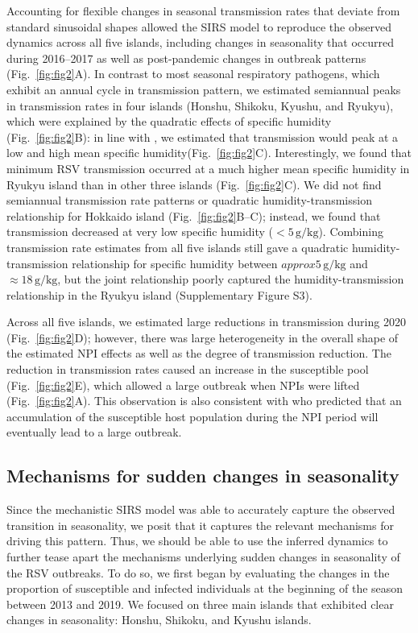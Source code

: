 \documentclass[12pt]{article}
\newcommand{\fref}[1]{Fig.~\ref{fig:#1}}
\begin{document}
Accounting for flexible changes in seasonal transmission rates that deviate from standard sinusoidal shapes allowed the SIRS model to reproduce the observed dynamics across all five islands, including changes in seasonality that occurred during 2016--2017 as well as post-pandemic changes in outbreak patterns (\fref{fig2}A).
In contrast to most seasonal respiratory pathogens, which exhibit an annual cycle in transmission pattern, we estimated semiannual peaks in transmission rates in four islands (Honshu, Shikoku, Kyushu, and Ryukyu), which were explained by the quadratic effects of specific humidity (\fref{fig2}B):
in line with \cite{baker2019epidemic}, we estimated that transmission would peak at a low and high mean specific humidity(\fref{fig2}C).
Interestingly, we found that minimum RSV transmission occurred at a much higher mean specific humidity in Ryukyu island than in other three islands (\fref{fig2}C).
We did not find semiannual transmission rate patterns or quadratic humidity-transmission relationship for Hokkaido island (\fref{fig2}B--C);
instead, we found that transmission decreased at very low specific humidity ($<5\,\mathrm{g/kg}$).
Combining transmission rate estimates from all five islands still gave a quadratic humidity-transmission relationship for specific humidity between $approx5\,\mathrm{g/kg}$ and $\approx18\,\mathrm{g/kg}$, but the joint relationship poorly captured the humidity-transmission relationship in the Ryukyu island (Supplementary Figure S3).

Across all five islands, we estimated large reductions in transmission during 2020  (\fref{fig2}D);
however, there was large heterogeneity in the overall shape of the estimated NPI effects as well as the degree of transmission reduction.
The reduction in transmission rates caused an increase in the susceptible pool (\fref{fig2}E), which allowed a large outbreak when NPIs were lifted (\fref{fig2}A).
This observation is also consistent with \cite{baker2019epidemic} who predicted that an accumulation of the susceptible host population during the NPI period will eventually lead to a large outbreak.

\subsection*{Mechanisms for sudden changes in seasonality}

Since the mechanistic SIRS model was able to accurately capture the observed transition in seasonality, we posit that it captures the relevant mechanisms for driving this pattern.
Thus, we should be able to use the inferred dynamics to further tease apart the mechanisms underlying sudden changes in seasonality of the RSV outbreaks.
To do so, we first began by evaluating the changes in the proportion of susceptible and infected individuals at the beginning of the season between 2013 and 2019.
We focused on three main islands that exhibited clear changes in seasonality: Honshu, Shikoku, and Kyushu islands. 
\end{document}
